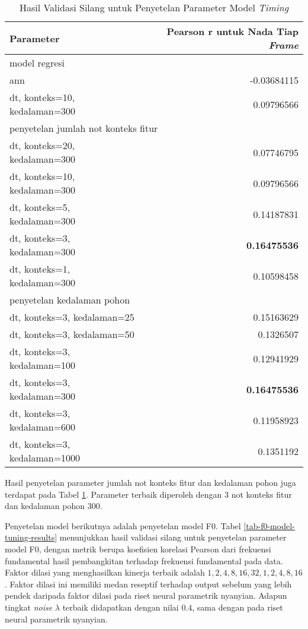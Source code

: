\begin{table}[h]
    \centering
    \caption{Hasil Validasi Silang untuk Penyetelan Parameter Model \textit{Timing}}\label{tab-timing-model-tuning-results}
    \begin{tabular}{ |l|r| } 
     \hline
     Parameter & Pearson r untuk Nada Tiap \textit{Frame} \\
     \hline 
     \multicolumn{2}{|l|}{model regresi}\\ \hline
	 ann    &-0.03684115\\ \hline
	 dt, konteks=10, kedalaman=300     & 0.09796566\\ \hline
	 \multicolumn{2}{|l|}{penyetelan jumlah not konteks fitur}\\ \hline
	 dt, konteks=20, kedalaman=300       &0.07746795\\ \hline
	 dt, konteks=10, kedalaman=300      &0.09796566\\ \hline
	 dt, konteks=5, kedalaman=300     &0.14187831\\ \hline
	 dt, konteks=3, kedalaman=300     &\textbf{0.16475536}\\ \hline
	 dt, konteks=1, kedalaman=300      &0.10598458\\ \hline
	 \multicolumn{2}{|l|}{penyetelan kedalaman pohon}\\ \hline
	 dt, konteks=3, kedalaman=25 	 &0.15163629\\\hline
	 dt, konteks=3, kedalaman=50     &0.1326507\\\hline
	 dt, konteks=3, kedalaman=100      &0.12941929\\\hline
	 dt, konteks=3, kedalaman=300     &\textbf{0.16475536}\\ \hline
	 dt, konteks=3, kedalaman=600     &0.11958923\\\hline
	 dt, konteks=3, kedalaman=1000     &0.1351192   \\  \hline
    \end{tabular}
\end{table}

Hasil penyetelan parameter jumlah not konteks fitur dan kedalaman pohon juga terdapat pada Tabel \ref{tab-timing-model-tuning-results}. Parameter terbaik diperoleh dengan 3 not konteks fitur dan kedalaman pohon 300.

Penyetelan model berikutnya adalah penyetelan model F0. Tabel \ref{tab-f0-model-tuning-results} menunjukkan hasil validasi silang untuk penyetelan parameter model F0, dengan metrik berupa koefisien korelasi Pearson dari frekuensi fundamental hasil pembangkitan terhadap frekuensi fundamental pada data. Faktor dilasi yang menghasilkan kinerja terbaik adalah $1,2,4,8,16,32,1,2,4,8,16$. Faktor dilasi ini memiliki medan reseptif terhadap output sebelum yang lebih pendek daripada faktor dilasi pada riset neural parametrik nyanyian. Adapun tingkat \textit{noise} $\lambda$ terbaik didapatkan dengan nilai $0.4$, sama dengan pada riset neural parametrik nyanyian.

